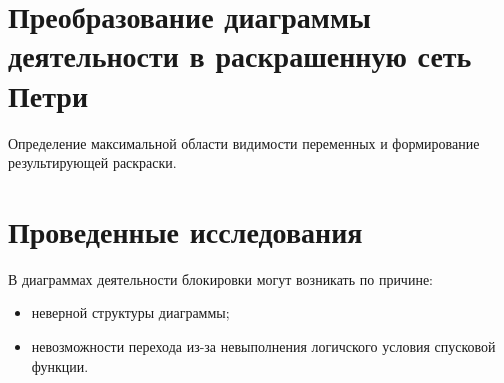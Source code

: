 \documentclass[12pt]{article}
\begin{document}
\section{Преобразование диаграммы деятельности в раскрашенную сеть  Петри}

\begin{minipage}[H]{0.55\linewidth}
\end{minipage}
\hfill
\begin{minipage}[H]{0.44\linewidth}
Определение максимальной области видимости переменных и формирование результирующей раскраски.
\end{minipage}

\section{Проведенные исследования}

В диаграммах деятельности блокировки могут возникать по причине:

\begin{itemize}
\item неверной структуры диаграммы;
\item невозможности перехода из-за невыполнения логичского условия спусковой функции.
\end{itemize}
\end{document}

